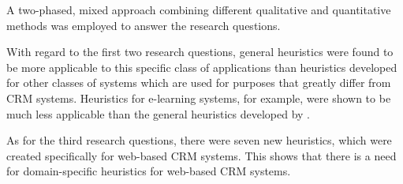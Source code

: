 \RQ{}

A two-phased, mixed approach combining different qualitative and quantitative methods was employed to answer the research questions.

With regard to the first two research questions, general heuristics were found to be more applicable to this specific class of applications than heuristics developed for other classes of systems which are used for purposes that greatly differ from CRM systems. Heuristics for e-learning systems, for example, were shown to be much less applicable than the general heuristics developed by \citet{Nielsen1994a}.

As for the third research questions, there were seven new heuristics, which were created specifically for web-based CRM systems. This shows that there is a need for domain-specific heuristics for web-based CRM systems.